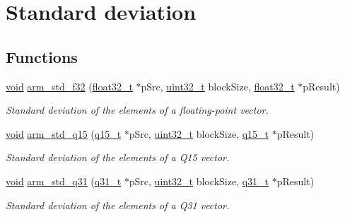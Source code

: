 \hypertarget{group___s_t_d}{\section{Standard deviation}
\label{group___s_t_d}
}
\subsection*{Functions}
\begin{DoxyCompactItemize}
\item 
\hyperlink{group___n_a_m_e_ga18028b8badbf1ea7e704ccac3c488e82}{void} \hyperlink{group___s_t_d_ga4969b5b5f3d001377bc401a3ee99dfc2}{arm\-\_\-std\-\_\-f32} (\hyperlink{arm__math_8h_a4611b605e45ab401f02cab15c5e38715}{float32\-\_\-t} $\ast$p\-Src, \hyperlink{stdint_8h_a435d1572bf3f880d55459d9805097f62}{uint32\-\_\-t} block\-Size, \hyperlink{arm__math_8h_a4611b605e45ab401f02cab15c5e38715}{float32\-\_\-t} $\ast$p\-Result)
\begin{DoxyCompactList}\small\item\em Standard deviation of the elements of a floating-\/point vector. \end{DoxyCompactList}\item 
\hyperlink{group___n_a_m_e_ga18028b8badbf1ea7e704ccac3c488e82}{void} \hyperlink{group___s_t_d_gaf9d27afa9928ff28a63cd98ea9218a72}{arm\-\_\-std\-\_\-q15} (\hyperlink{arm__math_8h_ab5a8fb21a5b3b983d5f54f31614052ea}{q15\-\_\-t} $\ast$p\-Src, \hyperlink{stdint_8h_a435d1572bf3f880d55459d9805097f62}{uint32\-\_\-t} block\-Size, \hyperlink{arm__math_8h_ab5a8fb21a5b3b983d5f54f31614052ea}{q15\-\_\-t} $\ast$p\-Result)
\begin{DoxyCompactList}\small\item\em Standard deviation of the elements of a Q15 vector. \end{DoxyCompactList}\item 
\hyperlink{group___n_a_m_e_ga18028b8badbf1ea7e704ccac3c488e82}{void} \hyperlink{group___s_t_d_ga39495e74f96116178be085c9dc7742f5}{arm\-\_\-std\-\_\-q31} (\hyperlink{arm__math_8h_adc89a3547f5324b7b3b95adec3806bc0}{q31\-\_\-t} $\ast$p\-Src, \hyperlink{stdint_8h_a435d1572bf3f880d55459d9805097f62}{uint32\-\_\-t} block\-Size, \hyperlink{arm__math_8h_adc89a3547f5324b7b3b95adec3806bc0}{q31\-\_\-t} $\ast$p\-Result)
\begin{DoxyCompactList}\small\item\em Standard deviation of the elements of a Q31 vector. \end{DoxyCompactList}\end{DoxyCompactItemize}


